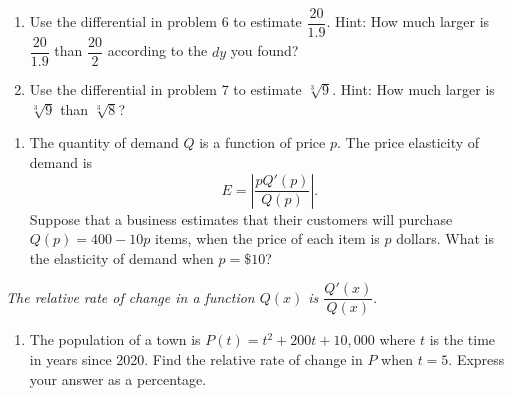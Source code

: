 \documentclass[10pt]{article}
\newcommand{\ds}{\displaystyle}
\begin{document}
\vfill

\begin{enumerate}
\setcounter{enumi}{\theenumCount}


\newpage
\item Use the differential in problem 6 to estimate $\dfrac{20}{1.9}$.  Hint: How much larger is $\dfrac{20}{1.9}$ than $\dfrac{20}{2}$ according to the $dy$ you found? 
\vfill



\item Use the differential in problem 7 to estimate $\sqrt[3]{9}$.  Hint: How much larger is $\sqrt[3]{9}$ than $\sqrt[3]{8}$?
\vfill

\setcounter{enumCount}{\theenumi}
\end{enumerate}


\begin{enumerate}
\setcounter{enumi}{\theenumCount}

\item The quantity of demand $Q$ is a function of price $p$. The price elasticity of demand is  
$$\ds E = \left| \frac{p Q'(p)}{Q(p)} \right|.$$
Suppose that a business estimates that their customers will purchase $Q(p) = 400-10p$ items, when the price of each item is $p$ dollars.  What is the elasticity of demand when $p = \$10$? %
  \vfill

\setcounter{enumCount}{\theenumi}
\end{enumerate}

\noindent
\emph{The relative rate of change in a function $Q(x)$ is $\dfrac{Q'(x)}{Q(x)}.$  }
\begin{enumerate}
\setcounter{enumi}{\theenumCount}

%

\item The population of a town is $P(t) = t^2 + 200 t + 10{,}000$ where $t$ is the time in years since 2020.  
Find the relative rate of change in $P$ when $t = 5$.  Express your answer as a percentage.   
\vfill

\setcounter{enumCount}{\theenumi}
\end{enumerate}
\end{document}

